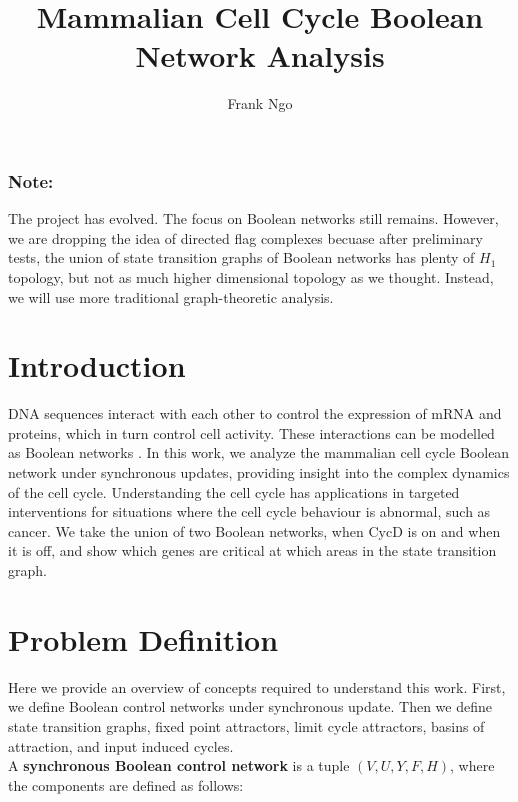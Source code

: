 \documentclass[sigconf]{acmart}
\begin{document}
\title{Mammalian Cell Cycle Boolean Network Analysis}

\author{Frank Ngo}

\maketitle

\subsubsection*{Note:}
The project has evolved.
The focus on Boolean networks still remains.
However, we are dropping the idea of directed flag complexes becuase after preliminary tests, the union of state transition graphs of Boolean networks has plenty of $H_1$ topology, but not as much higher dimensional topology as we thought.
Instead, we will use more traditional graph-theoretic analysis.

\section{Introduction}
DNA sequences interact with each other to control the expression of mRNA and proteins, which in turn control cell activity. 
These interactions can be modelled as Boolean networks \cite{Kauffman1969}.
In this work, we analyze the mammalian cell cycle Boolean network \cite{Faure2006} under synchronous updates, providing insight into the complex dynamics of the cell cycle.
Understanding the cell cycle has applications in targeted interventions for situations where the cell cycle behaviour is abnormal, such as cancer.
We take the union of two Boolean networks, when $\text{CycD}$ is on and when it is off, and show which genes are critical at which areas in the state transition graph.

\section{Problem Definition}
Here we provide an overview of concepts required to understand this work. 
First, we define Boolean control networks under synchronous update.
Then we define state transition graphs, fixed point attractors, limit cycle attractors, basins of attraction, and input induced cycles. \\

A \textbf{synchronous Boolean control network} is a tuple $(V, U, Y, F, H)$, where the components are defined as follows: 
\end{document}
